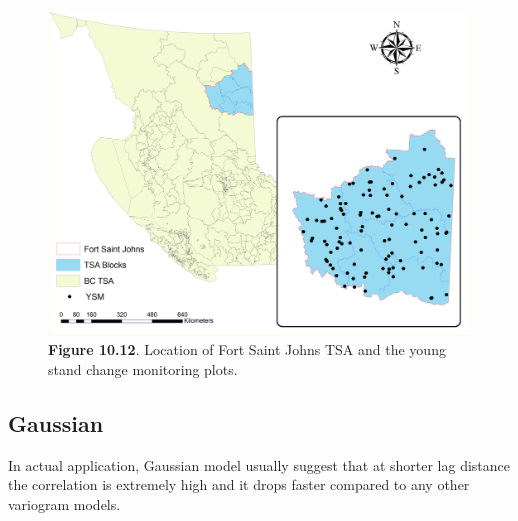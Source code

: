 \documentclass[
]{book}
\begin{document}
\begin{figure}
\centering
\includegraphics{images/10-FSJ-plot.png}
\caption{\textbf{Figure 10.12}. Location of Fort Saint Johns TSA and the young stand change monitoring plots.}
\end{figure}

\hypertarget{gaussian}{%
\subsection{Gaussian}\label{gaussian}}

In actual application, Gaussian model usually suggest that at shorter lag distance the correlation is extremely high and it drops faster compared to any other variogram models.
\end{document}
